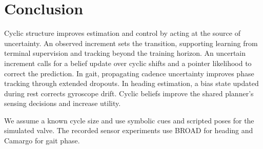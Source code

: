 \section{Conclusion}
\label{sec:discussion}
\label{sec:conclusion}

\begin{samepage}
Cyclic structure improves estimation and control by acting at the source of
uncertainty. An observed increment sets the transition, supporting learning
from terminal supervision and tracking beyond the training horizon. An
uncertain increment calls for a belief update over cyclic shifts and a
pointer likelihood to correct the prediction. In gait, propagating cadence
uncertainty improves phase tracking through extended dropouts. In heading
estimation, a bias state updated during rest corrects gyroscope drift.
Cyclic beliefs improve the shared planner's sensing decisions and increase
utility.
\par\nopagebreak[4]

We assume a known cycle size and use symbolic cues and scripted poses for the
simulated valve. The recorded sensor experiments use BROAD for heading and
Camargo for gait phase.
\end{samepage}
